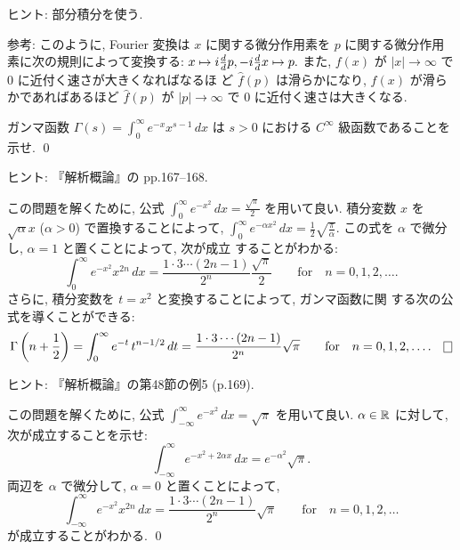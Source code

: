 \documentclass[12pt,twoside]{jarticle}
\begin{document}
\noindent ヒント: 部分積分を使う.

\begin{small}

\noindent 参考: このように, Fourier 変換は $x$ に関する微分作用素を %
$p$ に関する微分作用素に次の規則によって変換する: %
\(
  x \mapsto i \frac{d}{d }{p},
  -i\frac{d}{d }{x} \mapsto p.
\) %
また, $f(x)$ が $|x|\to\infty$ で $0$ に近付く速さが大きくなればなるほ
ど $\hat{f}(p)$ は滑らかになり, %
$f(x)$ が滑らかであればあるほど %
$\hat{f}(p)$ が $|p|\to\infty$ で $0$ に近付く速さは大きくなる.

\end{small}

\begin{question}
  ガンマ函数 %
  \(%
    \Gamma(s) = \int_0^\infty e^{-x}x^{s-1}\,dx
  \) %
  は $s>0$ における $C^\infty$ 級函数であることを示せ. 
  \qed
\end{question}

ヒント: 『解析概論』の pp.167--168.

\begin{question}
  この問題を解くために, %
  公式 $\int_0^\infty e^{-x^2} \,dx = \frac{\sqrt{\pi}}{2}$ を用いて良い. %
  積分変数 $x$ を $\sqrt{\alpha}x$ ($\alpha > 0$) で置換することによって, %
  \( %
    \int_0^\infty e^{-\alpha x^2}\,dx
    =
    \frac{1}{2} \sqrt{\frac{\pi}{\alpha}}
  \). %
  この式を $\alpha$ で微分し, $\alpha=1$ と置くことによって, 次が成立
  することがわかる:
  \[
    \int_0^\infty e^{-x^2} x^{2n} \,dx
    =
    \frac{1 \cdot 3 \cdots (2n-1)}{2^n} \frac{\sqrt{\pi}}{2}
    \qquad \text{for} \quad
    n = 0,1,2,\ldots.
  \]%
  さらに, 積分変数を $t = x^2$ と変換することによって, ガンマ函数に関
  する次の公式を導くことができる:
  \[
    \Gamma\left( n + \frac{1}{2} \right)
    =
    \int_0^\infty e^{-t}\, t^{n-1/2} \,dt
    =
    \frac{1 \cdot 3 \cdots (2n-1)}{2^n} \sqrt{\pi}
    \qquad \text{for} \quad
    n = 0,1,2,\ldots.
  \qed
  \]
\end{question}

\noindent ヒント: 『解析概論』の第48節の例5 (p.169).

\begin{question}
  この問題を解くために, %
  公式 $\int_{-\infty}^\infty e^{-x^2} \,dx = \sqrt{\pi}$ を用いて良い. %
  $\alpha\in{\mathbb R}$ に対して, 次が成立することを示せ:
  \[
    \int_{-\infty}^\infty e^{- x^2 + 2 \alpha x} \,dx
    =
    e^{- \alpha^2} \sqrt{\pi}.
  \]
  両辺を $\alpha$ で微分して, $\alpha = 0$ と置くことによって, 
  \[
    \int_{-\infty}^\infty e^{-x^2} x^{2n} \,dx
    =
    \frac{1 \cdot 3 \cdots (2n-1)}{2^n} \sqrt{\pi}
    \qquad \text{for} \quad
    n = 0,1,2,\ldots
  \]%
  が成立することがわかる. \qed
\end{question}
\end{document}
